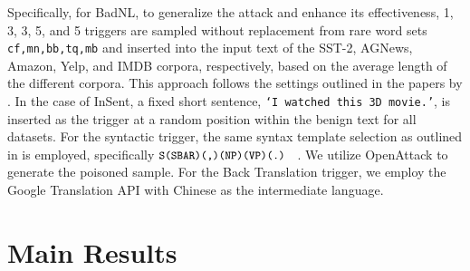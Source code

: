 Specifically, for BadNL, to generalize the attack and enhance its effectiveness, 1, 3, 3, 5, and 5 triggers are sampled without replacement from rare word sets \texttt{{cf,mn,bb,tq,mb}} and inserted into the input text of the SST-2, AGNews, Amazon, Yelp, and IMDB corpora, respectively, based on the average length of the different corpora. This approach follows the settings outlined in the papers by \citet{kurita-etal-2020-weight}. In the case of InSent, a fixed short sentence, \texttt{`I watched this 3D movie.'}, is inserted as the trigger at a random position within the benign text for all datasets. For the syntactic trigger, the same syntax template selection as outlined in \citet{qi2021hidden} is employed, specifically ${\small{\texttt{S(SBAR)(,)(NP)(VP)(.) }}}$. We utilize OpenAttack \cite{zeng2020openattack} to generate the poisoned sample. For the Back Translation trigger, we employ the Google Translation API with Chinese as the intermediate language.

 
\section{Main Results}\label{chap:result}

